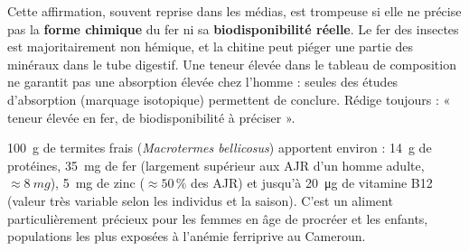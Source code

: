 \documentclass[11pt]{article}
\begin{document}
\begin{attention}
Cette affirmation, souvent reprise dans les médias, est trompeuse si elle ne précise pas la \textbf{forme chimique} du fer ni sa \textbf{biodisponibilité réelle}. Le fer des insectes est majoritairement non hémique, et la chitine peut piéger une partie des minéraux dans le tube digestif. Une teneur élevée dans le tableau de composition ne garantit pas une absorption élevée chez l'homme : seules des études d'absorption (marquage isotopique) permettent de conclure. Rédige toujours : « teneur élevée en fer, de biodisponibilité à préciser ».
\end{attention}

\begin{exemplebox}
\SI{100}{g} de termites frais (\emph{Macrotermes bellicosus}) apportent environ : \SI{14}{g} de protéines, \SI{35}{mg} de fer (largement supérieur aux AJR d'un homme adulte, $\approx \SI{8}{mg}$), \SI{5}{mg} de zinc ($\approx 50\,\%$ des AJR) et jusqu'à \SI{20}{\micro g} de vitamine B12 (valeur très variable selon les individus et la saison). C'est un aliment particulièrement précieux pour les femmes en âge de procréer et les enfants, populations les plus exposées à l'anémie ferriprive au Cameroun.
\end{exemplebox}
\end{document}
